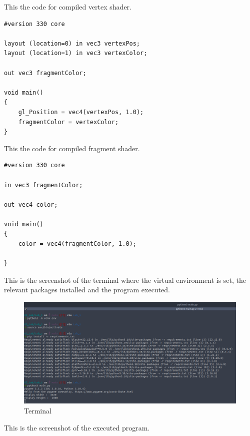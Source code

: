 \documentclass[12pt]{article}
\begin{document}
This the code for compiled vertex shader.
\begin{verbatim}
#version 330 core

layout (location=0) in vec3 vertexPos;
layout (location=1) in vec3 vertexColor;

out vec3 fragmentColor;

void main()
{
    gl_Position = vec4(vertexPos, 1.0);
    fragmentColor = vertexColor;
}
\end{verbatim}
This the code for compiled fragment shader.
\begin{verbatim}
#version 330 core

in vec3 fragmentColor;

out vec4 color;

void main()
{
    color = vec4(fragmentColor, 1.0);

}
\end{verbatim}
\clearpage
This is the screenshot of the terminal where the virtual environment is set, the relevant packages installed and the program executed.
\begin{figure}[h]
    \centerline{\includegraphics[width=200mm]{Lab1consoletrimmed.png}}
    \caption{Terminal}
    \label{fig}
\end{figure}
\clearpage
This is the screenshot of the executed program.
\end{document}

